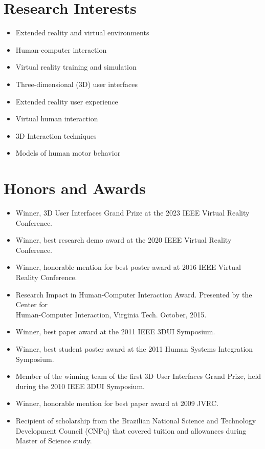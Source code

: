 \documentclass[wideaddress]{vitae}
\let\olditem\item
\def\item{\nopagebreak[4]\olditem}%
\begin{document}
\section{Research Interests}
\begin{itemize}
	\item{Extended reality and virtual environments}
	\item{Human-computer interaction}
	\item{Virtual reality training and simulation}
	\item{Three-dimensional (3D) user interfaces}
	\item{Extended reality user experience}
	\item{Virtual human interaction}
	\item{3D Interaction techniques}
	\item{Models of human motor behavior}
\end{itemize}

\section{Honors and Awards}
\begin{itemize}
	\item{Winner, 3D User Interfaces Grand Prize at the 2023 IEEE Virtual Reality Conference.}
	\item{Winner, best research demo award at the 2020 IEEE Virtual Reality Conference.}
	\item{Winner, honorable mention for best poster award at 2016 IEEE Virtual Reality Conference.}
	\item{Research Impact in Human-Computer Interaction Award. Presented by the Center for\\Human-Computer Interaction, Virginia Tech. October, 2015.}
	\item{Winner, best paper award at the 2011 IEEE 3DUI Symposium.}
	\item{Winner, best student poster award at the 2011 Human Systems Integration Symposium.}
	\item{Member of the winning team of the first 3D User Interfaces Grand Prize, held during the 2010 IEEE 3DUI Symposium.}
	\item{Winner, honorable mention for best paper award at 2009 JVRC.}
	\item{Recipient of scholarship from the Brazilian National Science and Technology Development Council (CNPq) that covered tuition and allowances during Master of Science study.}
\end{itemize}
\end{document}
